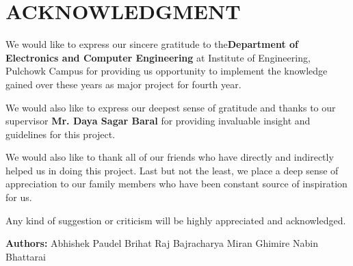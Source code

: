 
\newpage
\section*{ACKNOWLEDGMENT}
We would like to express our sincere gratitude to the ​{\bf Department of Electronics and Computer Engineering} at Institute of Engineering, Pulchowk Campus for providing us opportunity to implement the knowledge gained over these years as major project for fourth year.

We would also like to express our deepest sense of gratitude and thanks to our supervisor {\bf Mr. Daya Sagar Baral} for providing invaluable insight and guidelines for this project.

We would also like to thank all of our friends who have directly and indirectly helped us in doing this project. Last but not the least, we place a deep sense of appreciation to our family members who have been constant source of inspiration for us.

Any kind of suggestion or criticism will be highly appreciated and acknowledged.

\vskip 10mm
{\bf Authors:}
\newline Abhishek Paudel
\newline Brihat Raj Bajracharya
\newline Miran Ghimire
\newline Nabin Bhattarai